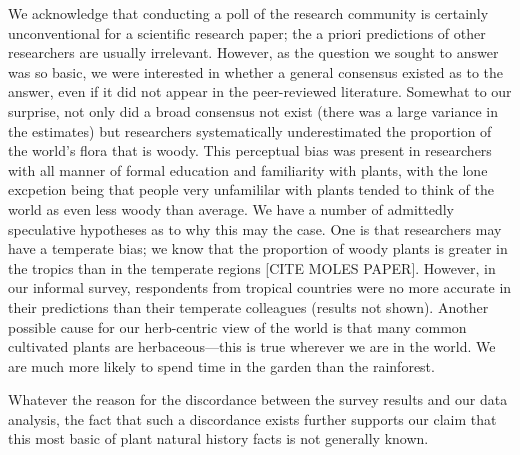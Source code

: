 \documentclass[12pt]{article}
\begin{document}
We acknowledge that conducting a poll of the research community is certainly unconventional for a scientific research paper; the a priori predictions of other researchers are usually irrelevant. However, as the question we sought to answer was so basic, we were interested in whether a general consensus existed as to the answer, even if it did not appear in the peer-reviewed literature. Somewhat to our surprise, not only did a broad consensus not exist (there was a large variance in the estimates) but researchers systematically underestimated the proportion of the world's flora that is woody. This perceptual bias was present in researchers with all manner of formal education and familiarity with plants, with the lone excpetion being that people very unfamililar with plants tended to think of the world as even less woody than average. We have a number of admittedly speculative hypotheses as to why this may the case. One is that researchers may have a temperate bias; we know that the proportion of woody plants is greater in the tropics than in the temperate regions [CITE MOLES PAPER]. However, in our informal survey, respondents from tropical countries were no more accurate in their predictions than their temperate colleagues (results not shown). Another possible cause for our herb-centric view of the world is that many common cultivated plants are herbaceous---this is true wherever we are in the world. We are much more likely to spend time in the garden than the rainforest. 

Whatever the reason for the discordance between the survey results and our data analysis, the fact that such a discordance exists further supports our claim that this most basic of plant natural history facts is not generally known.   





\end{document}
